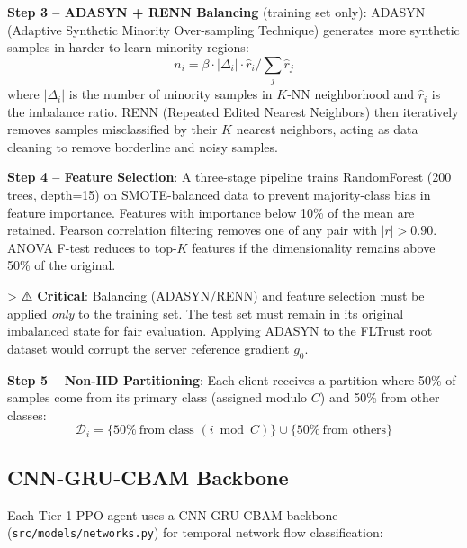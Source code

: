 \documentclass[conference]{IEEEtran}
\begin{document}
\textbf{Step 3 -- ADASYN + RENN Balancing} (training set only): ADASYN (Adaptive Synthetic Minority Over-sampling Technique) generates more synthetic samples in harder-to-learn minority regions:
\begin{equation}
n_i = \beta \cdot |\Delta_i| \cdot \hat{r}_i / \sum_j \hat{r}_j
\end{equation}
where $|\Delta_i|$ is the number of minority samples in $K$-NN neighborhood and $\hat{r}_i$ is the imbalance ratio. RENN (Repeated Edited Nearest Neighbors) then iteratively removes samples misclassified by their $K$ nearest neighbors, acting as data cleaning to remove borderline and noisy samples.

\textbf{Step 4 -- Feature Selection}: A three-stage pipeline trains RandomForest (200 trees, depth=15) on SMOTE-balanced data to prevent majority-class bias in feature importance. Features with importance below 10\% of the mean are retained. Pearson correlation filtering removes one of any pair with $|r| > 0.90$. ANOVA F-test reduces to top-$K$ features if the dimensionality remains above 50\% of the original.

> ⚠️ \textbf{Critical}: Balancing (ADASYN/RENN) and feature selection must be applied \emph{only} to the training set. The test set must remain in its original imbalanced state for fair evaluation. Applying ADASYN to the FLTrust root dataset would corrupt the server reference gradient $g_0$.

\textbf{Step 5 -- Non-IID Partitioning}: Each client receives a partition where 50\% of samples come from its primary class (assigned modulo $C$) and 50\% from other classes:
\begin{equation}
\mathcal{D}_i = \{50\%\ \text{from class } (i \bmod C)\} \cup \{50\%\ \text{from others}\}
\end{equation}

\subsection{CNN-GRU-CBAM Backbone}
\label{sec:cnngru}

Each Tier-1 PPO agent uses a CNN-GRU-CBAM backbone (\texttt{src/models/networks.py}) for temporal network flow classification:
\end{document}
